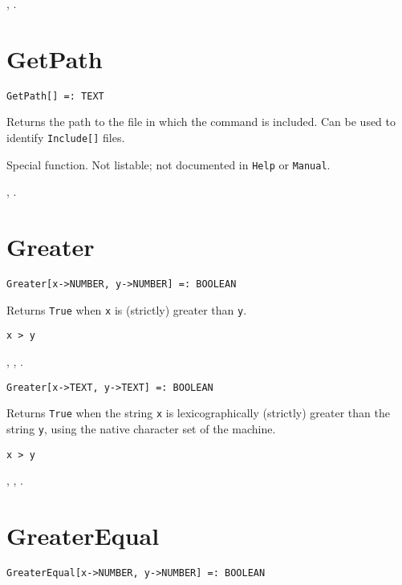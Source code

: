 \seealso {}, .


\section*{GetPath}\label{PrimGetPath}
\begin{verbatim}
GetPath[] =: TEXT 
\end{verbatim}

\noindent
Returns the path to the file in which the command is included.  Can be
used to identify \verb+Include[]+ files. 

\note Special function.  Not listable; not documented in
\verb+Help+ or \verb+Manual+.

\seealso {},
.


\section*{Greater}\label{PrimGreater}
\begin{verbatim}
Greater[x->NUMBER, y->NUMBER] =: BOOLEAN 
\end{verbatim}

\noindent
Returns \verb+True+ when \verb+x+ is (strictly) greater than \verb+y+.

\shortform \verb+x > y+

\seealso {},
, .

\begin{verbatim}
Greater[x->TEXT, y->TEXT] =: BOOLEAN 
\end{verbatim}

\noindent
Returns \verb+True+ when the string \verb+x+ is lexicographically (strictly)
greater than the string \verb+y+, using the native character set of the 
machine.

\shortform \verb+x > y+

\seealso {},
, .


\section*{GreaterEqual}\label{PrimGreaterEqual}
\begin{verbatim}
GreaterEqual[x->NUMBER, y->NUMBER] =: BOOLEAN 
\end{verbatim}

